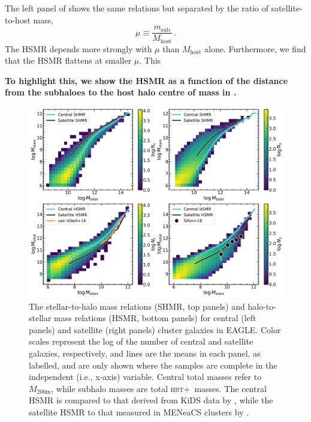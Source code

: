 \documentclass[usenatbib,fleqn]{mnras}
\newcommand{\comment}[1]{\textbf{\color{magenta} #1}}
\newcommand{\eagle}{EAGLE}
\newcommand{\hbt}{\textsc{hbt+}}
\newcommand{\msub}{m_\mathrm{sub}}
\newcommand{\Mhost}{M_\mathrm{host}}
\begin{document}
The left panel of  shows the same relations but separated by the ratio of satellite-to-host mass,
\begin{equation}\label{eq:mu}
  \mu \equiv \frac{\msub}{\Mhost} \,.
\end{equation}
The HSMR depends more strongly with $\mu$ than $\Mhost$ alone. Furthermore, we find that the HSMR flattens at smaller $\mu$. This

\comment{To highlight this, we show the HSMR as a function of the distance from the subhaloes to the host halo centre of mass in \Cref{fig:hsmr_R}.}


\begin{figure}
  \centerline{\includegraphics[width=\linewidth]{shmr_censat.pdf}}
  \caption{The stellar-to-halo mass relations (SHMR, top panels) and halo-to-stellar mass relations (HSMR, bottom panels) for central (left panels) and satellite (right panels) cluster galaxies in \eagle. Color scales represent the log of the number of central and satellite galaxies, respectively, and lines are the means in each panel, as labelled, and are only shown where the samples are complete in the independent (i.e., x-axis) variable. Central total masses refer to $M_\mathrm{200m}$, while subhalo masses are total \hbt\ masses. The central HSMR is compared to that derived from KiDS data by \citet{vanuitert16}, while the satellite HSMR to that measured in MENeaCS clusters by \citet{sifon18_meneacs}.}
  \label{f:shmr_now}
\end{figure}
\end{document}
